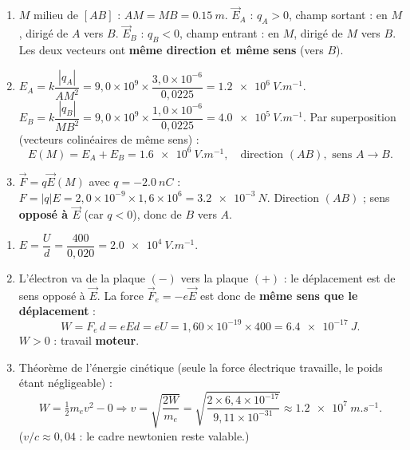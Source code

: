 \documentclass[11pt]{article}
\begin{document}
\begin{corrige}
\begin{enumerate}
\item $M$ milieu de $[AB]$ : $AM = MB = \SI{0,15}{m}$.
$\vec{E}_A$ : $q_A > 0$, champ sortant : en $M$, dirigé de $A$ vers $B$.
$\vec{E}_B$ : $q_B < 0$, champ entrant : en $M$, dirigé de $M$ vers $B$.
Les deux vecteurs ont \textbf{même direction et même sens} (vers $B$).
\item $E_A = k\dfrac{|q_A|}{AM^2} = 9,0\times 10^{9}\times\dfrac{3,0\times 10^{-6}}{0,0225} = \SI{1,2e6}{V.m^{-1}}$.
$E_B = k\dfrac{|q_B|}{MB^2} = 9,0\times 10^{9}\times\dfrac{1,0\times 10^{-6}}{0,0225} = \SI{4,0e5}{V.m^{-1}}$.
Par superposition (vecteurs colinéaires de même sens) :
\[ E(M) = E_A + E_B = \SI{1,6e6}{V.m^{-1}}, \quad \text{direction } (AB), \text{ sens } A \to B. \]
\item $\vec{F} = q\vec{E}(M)$ avec $q = -\SI{2,0}{nC}$ :
$F = |q|E = 2,0\times 10^{-9}\times 1,6\times 10^{6} = \SI{3,2e-3}{N}$.
Direction $(AB)$ ; sens \textbf{opposé à $\vec{E}$} (car $q<0$), donc de $B$ vers $A$.
\end{enumerate}
\end{corrige}

\begin{corrige}
\begin{enumerate}
\item $E = \dfrac{U}{d} = \dfrac{400}{0,020} = \SI{2,0e4}{V.m^{-1}}$.
\item L'électron va de la plaque $(-)$ vers la plaque $(+)$ : le déplacement est de sens opposé à $\vec{E}$. La force $\vec{F}_e = -e\vec{E}$ est donc de \textbf{même sens que le déplacement} :
\[ W = F_e\, d = eEd = eU = 1,60\times 10^{-19}\times 400 = \SI{6,4e-17}{J}. \]
$W > 0$ : travail \textbf{moteur}.
\item Théorème de l'énergie cinétique (seule la force électrique travaille, le poids étant négligeable) :
\[ W = \tfrac{1}{2}m_e v^2 - 0 \Rightarrow v = \sqrt{\frac{2W}{m_e}} = \sqrt{\frac{2\times 6,4\times 10^{-17}}{9,11\times 10^{-31}}} \approx \SI{1,2e7}{m.s^{-1}}. \]
($v/c \approx 0,04$ : le cadre newtonien reste valable.)
\end{enumerate}
\end{corrige}
\end{document}
